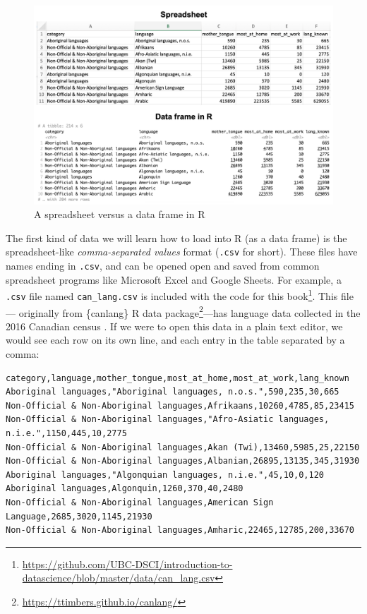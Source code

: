 \documentclass[
]{krantz}
\renewcommand{\href}[2]{#2\footnote{\url{#1}}}
\begin{document}
\begin{figure}
\includegraphics[width=1\linewidth]{img/spreadsheet_vs_dataframe} \caption{A spreadsheet versus a data frame in R}\label{fig:img-spreadsheet-vs-dataframe}
\end{figure}

The first kind of data we will learn how to load into R (as a data frame) is the
spreadsheet-like \emph{comma-separated values} format (\texttt{.csv} for short).
These files have names ending in \texttt{.csv}, and can be opened open and saved from common spreadsheet programs like Microsoft Excel and Google Sheets.
For example, a \texttt{.csv} file named \texttt{can\_lang.csv} \href{https://github.com/UBC-DSCI/introduction-to-datascience/blob/master/data/can_lang.csv}{is included with the code for this book}.
This file--- originally from \href{https://ttimbers.github.io/canlang/}{\{canlang\} R data package}---has language data collected in the 2016 Canadian census \citep{cancensus2016}.
If we were to open this data in a plain text editor, we would see each row on its own line, and each entry in the table separated by a comma:

\begin{verbatim}
category,language,mother_tongue,most_at_home,most_at_work,lang_known
Aboriginal languages,"Aboriginal languages, n.o.s.",590,235,30,665
Non-Official & Non-Aboriginal languages,Afrikaans,10260,4785,85,23415
Non-Official & Non-Aboriginal languages,"Afro-Asiatic languages, n.i.e.",1150,445,10,2775
Non-Official & Non-Aboriginal languages,Akan (Twi),13460,5985,25,22150
Non-Official & Non-Aboriginal languages,Albanian,26895,13135,345,31930
Aboriginal languages,"Algonquian languages, n.i.e.",45,10,0,120
Aboriginal languages,Algonquin,1260,370,40,2480
Non-Official & Non-Aboriginal languages,American Sign Language,2685,3020,1145,21930
Non-Official & Non-Aboriginal languages,Amharic,22465,12785,200,33670
\end{verbatim}
\end{document}
